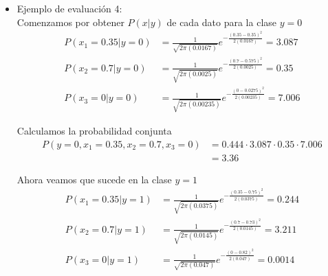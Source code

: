 \begin{itemize}
    Ahora veamos que sucede en la clase $y=1$
    \begin{align*}
        P(x_1=1|y=1) & = \frac{1}{\sqrt{2\pi(0.0375)}} e^{-\frac{(1-0.75)^2}{2(0.0375)}} = 0.895 \\
        P(x_2=0.9|y=1) & = \frac{1}{\sqrt{2\pi(0.0145)}} e^{-\frac{(0.9-0.73)^2}{2(0.0145)}} = 1.223 \\
        P(x_3=0.1|y=1) & = \frac{1}{\sqrt{2\pi(0.047)}} e^{-\frac{(0.1-0.82)^2}{2(0.047)}} = 0.0074
    \end{align*}

    Calculamos la probabilidad conjunta
    \begin{align*}
        P(y=1, x_1=1, x_2=0.9, x_3=0.1) & = 0.556 \cdot 0.895 \cdot 1.223 \cdot 0.0074 \\
        & = 0.0045
    \end{align*}
    
    Veamos que la probabilidad conjunta de la clase $y=1$ es mayor que la de la clase $y=0$, por lo que se estima que este ejemplo de evaluación pertenece a la clase $y=1$ con una probabilidad de $\frac{0.0045}{0 + 0.0045} = 1$, lo cual coincide con lo indicado ya que se indica que es de la clase $y=1$.
    \newpage
    
    \item Ejemplo de evaluación 4:\\
    Comenzamos por obtener $P(x|y)$ de cada dato para la clase $y=0$
    \begin{align*}
        P(x_1=0.35|y=0) & = \frac{1}{\sqrt{2\pi(0.0167)}} e^{-\frac{(0.35-0.35)^2}{2(0.0167)}} = 3.087  \\
        P(x_2=0.7|y=0) & = \frac{1}{\sqrt{2\pi(0.0025)}} e^{-\frac{(0.7-0.575)^2}{2(0.0025)}} = 0.35 \\
        P(x_3=0|y=0) & = \frac{1}{\sqrt{2\pi(0.00235)}} e^{-\frac{(0-0.0275)^2}{2(0.00235)}} = 7.006
    \end{align*}

    Calculamos la probabilidad conjunta
    \begin{align*}
        P(y=0, x_1=0.35, x_2=0.7, x_3=0) & = 0.444 \cdot 3.087 \cdot 0.35 \cdot 7.006 \\
        & = 3.36
    \end{align*}

    Ahora veamos que sucede en la clase $y=1$
    \begin{align*}
        P(x_1=0.35|y=1) & = \frac{1}{\sqrt{2\pi(0.0375)}} e^{-\frac{(0.35-0.75)^2}{2(0.0375)}} = 0.244 \\
        P(x_2=0.7|y=1) & = \frac{1}{\sqrt{2\pi(0.0145)}} e^{-\frac{(0.7-0.73)^2}{2(0.0145)}} = 3.211 \\
        P(x_3=0|y=1) & = \frac{1}{\sqrt{2\pi(0.047)}} e^{-\frac{(0-0.82)^2}{2(0.047)}} = 0.0014
    \end{align*}


\end{itemize}
